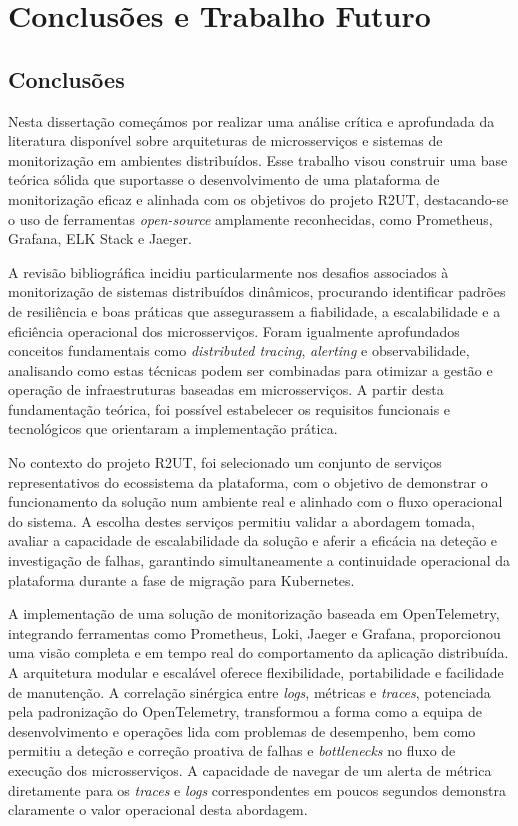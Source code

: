 \chapter{Conclusões e Trabalho Futuro}

\section{Conclusões}

Nesta dissertação começámos por realizar uma análise crítica e aprofundada da literatura disponível sobre arquiteturas de microsserviços e sistemas de monitorização em ambientes distribuídos. Esse trabalho visou construir uma base teórica sólida que suportasse o desenvolvimento de uma plataforma de monitorização eficaz e alinhada com os objetivos do projeto R2UT, destacando-se o uso de ferramentas \textit{open-source} amplamente reconhecidas, como Prometheus, Grafana, ELK Stack e Jaeger.

A revisão bibliográfica incidiu particularmente nos desafios associados à monitorização de sistemas distribuídos dinâmicos, procurando identificar padrões de resiliência e boas práticas que assegurassem a fiabilidade, a escalabilidade e a eficiência operacional dos microsserviços. Foram igualmente aprofundados conceitos fundamentais como \textit{distributed tracing}, \textit{alerting} e observabilidade, analisando como estas técnicas podem ser combinadas para otimizar a gestão e operação de infraestruturas baseadas em microsserviços. A partir desta fundamentação teórica, foi possível estabelecer os requisitos funcionais e tecnológicos que orientaram a implementação prática.

No contexto do projeto R2UT, foi selecionado um conjunto de serviços representativos do ecossistema da plataforma, com o objetivo de demonstrar o funcionamento da solução num ambiente real e alinhado com o fluxo operacional do sistema. A escolha destes serviços permitiu validar a abordagem tomada, avaliar a capacidade de escalabilidade da solução e aferir a eficácia na deteção e investigação de falhas, garantindo simultaneamente a continuidade operacional da plataforma durante a fase de migração para Kubernetes.

A implementação de uma solução de monitorização baseada em OpenTelemetry, integrando ferramentas como Prometheus, Loki, Jaeger e Grafana, proporcionou uma visão completa e em tempo real do comportamento da aplicação distribuída. A arquitetura modular e escalável oferece flexibilidade, portabilidade e facilidade de manutenção. A correlação sinérgica entre \textit{logs}, métricas e \textit{traces}, potenciada pela padronização do OpenTelemetry, transformou a forma como a equipa de desenvolvimento e operações lida com problemas de desempenho, bem como permitiu a deteção e correção proativa de falhas e \textit{bottlenecks} no fluxo de execução dos microsserviços. A capacidade de navegar de um alerta de métrica diretamente para os \textit{traces} e \textit{logs} correspondentes em poucos segundos demonstra claramente o valor operacional desta abordagem.

